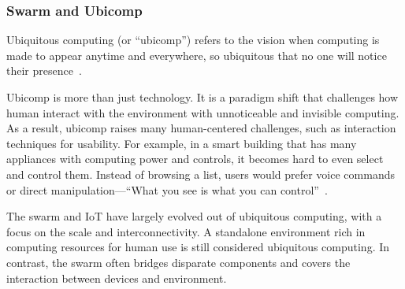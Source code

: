 \subsubsection{Swarm and Ubicomp}
\label{sec:swarm-wsn}

Ubiquitous computing (or ``ubicomp'') refers to the vision when computing is
made to appear anytime and everywhere, so ubiquitous that no one will notice
their presence~\cite{weiser1993ubiquitous}.

Ubicomp is more than just technology. It is a paradigm shift that challenges how
human interact with the environment with unnoticeable and invisible
computing. As a result, ubicomp raises many human-centered challenges, such as
interaction techniques for usability. For example, in a smart building that has
many appliances with computing power and controls, it becomes hard to even
select and control them. Instead of browsing a list, users would prefer voice
commands~\cite{alexa} or direct manipulation---``What you see is what you can
control''~\cite{zhang2014hobs, chen2018snaplink}.

The swarm and IoT have largely evolved out of ubiquitous computing, with a focus
on the scale and interconnectivity. A standalone environment rich in computing
resources for human use is still considered ubiquitous computing. In contrast,
the swarm often bridges disparate components and covers the interaction between
devices and environment.

